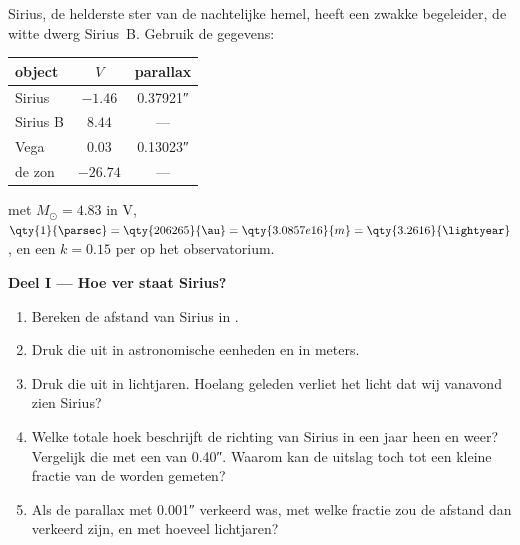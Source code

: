 \begin{problem}
\label{pb:b1:observing-the-sky:1}
Sirius, de helderste ster van de nachtelijke hemel, heeft een zwakke begeleider, de witte dwerg
Sirius~B. Gebruik de gegevens:
\begin{center}
\small
\begin{tabular}{lcc}
\hline
object & $V$ & parallax \\
\hline
Sirius & $-1.46$ & \ang{;;0.37921} \\
Sirius B & $8.44$ & --- \\
Vega & $0.03$ & \ang{;;0.13023} \\
de zon & $-26.74$ & --- \\
\hline
\end{tabular}
\end{center}
met $M_\odot = 4.83$ in V, $\qty{1}{\parsec} = \qty{206265}{\au} =
\qty{3.0857e16}{m} = \qty{3.2616}{\lightyear}$, en een  $k = 0.15$ per
 op het observatorium.

\medskip
\noindent\textbf{Deel I --- Hoe ver staat Sirius?}
\begin{enumerate}
  \item Bereken de afstand van Sirius in .
  \item Druk die uit in astronomische eenheden en in meters.
  \item Druk die uit in lichtjaren. Hoelang geleden verliet het licht dat wij vanavond zien Sirius?
  \item Welke totale hoek beschrijft de richting van Sirius in een jaar heen en weer? Vergelijk die
        met een  van \ang{;;0.40}. Waarom kan de uitslag toch tot een kleine fractie van de
         worden gemeten?
  \item Als de parallax met \ang{;;0.001} verkeerd was, met welke fractie zou de afstand dan
        verkeerd zijn, en met hoeveel lichtjaren?
\end{enumerate}


\end{problem}
